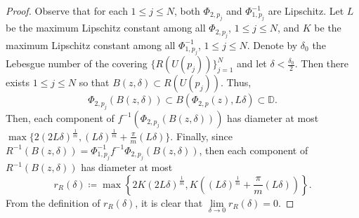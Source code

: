 \documentclass[10pt,a4paper]{amsart}
\begin{document}
\begin{proof}
Observe that for each $1\leq j\leq N$, both $\Phi_{2,p_j}$ and $\Phi_{1,p_j}^{-1}$ are Lipschitz. Let $L$ be the maximum Lipschitz constant among all $\Phi_{2,p_j}$, $1\leq j\leq N$, and $K$ be the maximum Lipschitz constant among all $\Phi_{1,p_j}^{-1}$, $1\leq j\leq N$. Denote by $\delta_0$ the Lebesgue number of the covering $\lbrace R(U(p_j))\rbrace_{j=1}^N$ and let $\delta<\frac{\delta_0}{2}$. Then there exists $1\leq j\leq N$ so that $B(z,\delta)\subset R(U(p_j))$. Thus,
$$\Phi_{2,p_j}(B(z,\delta))\subset B(\Phi_{2,p}(z),L\delta)\subset\mathbb{D}.$$
Then, each component of $f^{-1}(\Phi_{2,p_j}(B(z,\delta)))$ has diameter at most $\max\lbrace 2(2L\delta)^{\frac{1}{m}},(L\delta)^{\frac{1}{m}}+\frac{\pi}{m}(L\delta)\rbrace$. Finally, since $R^{-1}(B(z,\delta))=\Phi_{1,p_j}^{-1}f^{-1}\Phi_{2,p_j}(B(z,\delta))$, then each component of $R^{-1}(B(z,\delta))$ has diameter at most
$$r_R(\delta)\coloneqq\max\left\lbrace 2K(2L\delta)^{\frac{1}{m}},K((L\delta)^{\frac{1}{m}}+\dfrac{\pi}{m}(L\delta))\right\rbrace.$$
From the definition of $r_R(\delta)$, it is clear that $\lim\limits_{\delta\to 0}r_R(\delta)=0$. 
\end{proof}
\end{document}
